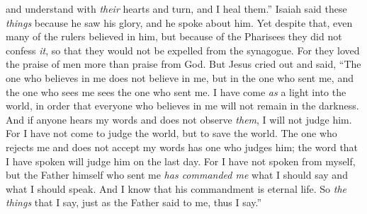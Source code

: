 \begin{biblechapter}
and understand with \textit{their} hearts 
and turn, and I heal them.”
\verse Isaiah said these \textit{things} because he saw his glory, and he spoke about him.
\verse Yet despite that, even many of the rulers believed in him, but because of the Pharisees they did not confess \textit{it}, so that they would not be expelled from the synagogue.
\verse For they loved the praise of men more than praise from God.
 But Jesus cried out and said, “The one who believes in me does not believe in me, but in the one who sent me,
\verse and the one who sees me sees the one who sent me.
\verse I have come \textit{as} a light into the world, in order that everyone who believes in me will not remain in the darkness.
\verse And if anyone hears my words and does not observe \textit{them}, I will not judge him. For I have not come to judge the world, but to save the world.
\verse The one who rejects me and does not accept my words has one who judges him; the word that I have spoken will judge him on the last day.
\verse For I have not spoken from myself, but the Father himself who sent me \textit{has commanded me} what I should say and what I should speak.
\verse And I know that his commandment is eternal life. So \textit{the things} that I say, just as the Father said to me, thus I say.”
\end{biblechapter}

